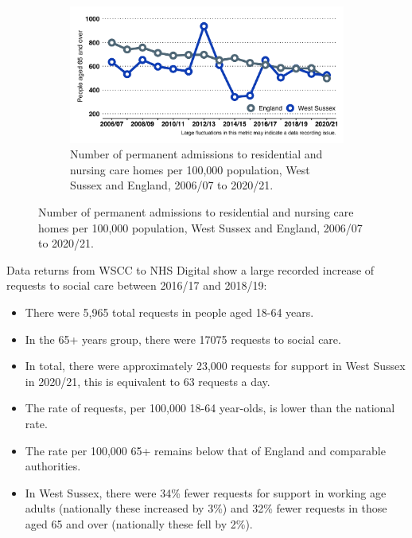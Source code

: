 \begin{figure}
\begin{subfigure}[b]{0.49\textwidth}
        \label{fig:sc:requests_65_plus}
    \end{subfigure}
    \begin{subfigure}[b]{0.55\textwidth}
        \centering
        \includegraphics[width=\textwidth]{images/perm_res_adm_time.png}
        \caption{Number of permanent admissions to residential and nursing care homes per 100,000 population, West Sussex and England, 2006/07 to 2020/21.}
        \label{fig:sc:residential_admissions}
    \end{subfigure}
\end{figure}




Data returns from WSCC to NHS Digital show a large recorded increase of requests to social care between 2016/17 and 2018/19:

\begin{itemize}[noitemsep]
    \item There were 5,965 total requests in people aged 18-64 years.
    \item In the 65+ years group, there were 17075 requests to social care.
    \item In total, there were approximately 23,000 requests for support in West Sussex in 2020/21, this is equivalent to 63 requests a day.
    \item The rate of requests, per 100,000 18-64 year-olds, is lower than the national rate.
    \item The rate per 100,000 65+ remains below that of England and comparable authorities.
    \item In West Sussex, there were 34\% fewer requests for support in working age adults (nationally these increased by 3\%) and 32\% fewer requests in those aged 65 and over (nationally these fell by 2\%).
\end{itemize}


